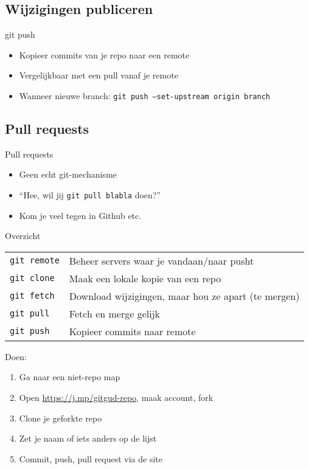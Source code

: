 \subsection{Wijzigingen publiceren}
\begin{frame}{git push}
	\begin{itemize}
		\item Kopieer commits van je repo naar een remote
		\item Vergelijkbaar met een pull vanaf je remote
		\item Wanneer nieuwe branch: \texttt{git push --set-upstream origin branch}
	\end{itemize}
\end{frame}

\subsection{Pull requests}
\begin{frame}{Pull requests}
	\begin{itemize}
		\item Geen echt git-mechanisme
		\item ``Hee, wil jij \texttt{git pull blabla} doen?''
		\item Kom je veel tegen in Github etc.
	\end{itemize}
\end{frame}

\begin{frame}{Overzicht}
	\begin{tabular}{ll}
		\texttt{git remote}		& Beheer servers waar je vandaan/naar pusht\\
		\texttt{git clone}		& Maak een lokale kopie van een repo\\
		\texttt{git fetch}		& Download wijzigingen, maar hou ze apart (te mergen)\\
		\texttt{git pull}		& Fetch en merge gelijk\\
		\texttt{git push}		& Kopieer commits naar remote
	\end{tabular}
	Doen:
	\begin{enumerate}
		\item Ga naar een niet-repo map
		\item Open \url{https://j.mp/gitgud-repo}, maak account, fork
		\item Clone je geforkte repo
		\item Zet je naam of iets anders op de lijst
		\item Commit, push, pull request via de site
	\end{enumerate}
\end{frame}
